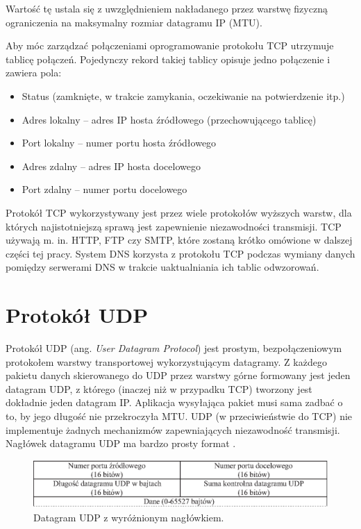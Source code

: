 Wartość tę ustala się z uwzględnieniem nakładanego przez warstwę fizyczną ograniczenia na maksymalny rozmiar 
datagramu IP (MTU).

Aby móc zarządzać połączeniami oprogramowanie protokołu TCP utrzymuje tablicę połączeń. Pojedynczy rekord takiej 
tablicy opisuje jedno połączenie i zawiera pola: 
\begin{itemize}
\item Status (zamknięte, w trakcie zamykania, oczekiwanie na potwierdzenie itp.)
\item Adres lokalny -- adres IP hosta źródłowego (przechowującego tablicę)
\item Port lokalny -- numer portu hosta źródłowego
\item Adres zdalny -- adres IP hosta docelowego
\item Port zdalny -- numer portu docelowego
\end{itemize}

Protokół TCP wykorzystywany jest przez wiele protokołów wyższych warstw, dla których najistotniejszą sprawą jest 
zapewnienie niezawodności transmisji. TCP używają m. in. HTTP, FTP czy SMTP, które zostaną krótko omówione w 
dalszej części tej pracy. System DNS korzysta z protokołu TCP podczas wymiany danych pomiędzy serwerami DNS w 
trakcie uaktualniania ich tablic odwzorowań.

\section{Protokół UDP}

Protokół UDP (ang. \emph{User Datagram Protocol}) jest prostym, bezpołączeniowym protokołem warstwy transportowej 
wykorzystującym datagramy. Z każdego pakietu danych skierowanego do UDP przez warstwy górne formowany jest 
jeden datagram UDP, z którego (inaczej niż w przypadku TCP) tworzony jest dokładnie jeden datagram IP. Aplikacja 
wysyłająca pakiet musi sama zadbać o to, by jego długość nie przekroczyła MTU. UDP (w przeciwieństwie do TCP) 
nie implementuje żadnych mechanizmów zapewniających niezawodność transmisji.  Nagłówek datagramu UDP ma bardzo 
prosty format \cite{barylo2}.
\begin{figure}[h]
\centering
\includegraphics[width=5in]{./rysunki/datagram_udp.eps}
\caption{Datagram UDP z wyróżnionym nagłówkiem.}
\label{datagram_udp}
\end{figure}
 

